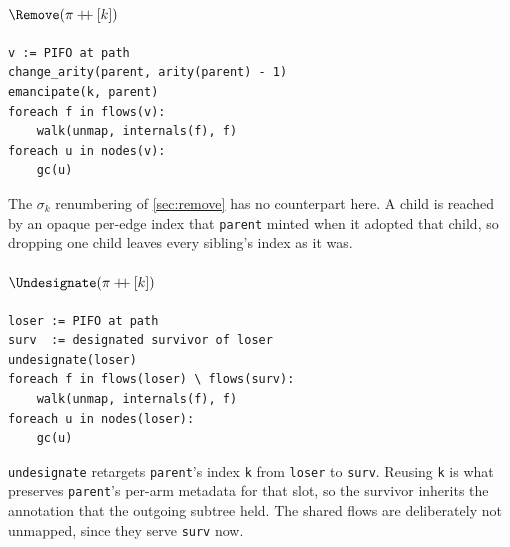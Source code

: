 \paragraph{\(\Remove(\pi \mathbin{+\!\!+} [k])\)}
\begin{Verbatim}
v := PIFO at path
change_arity(parent, arity(parent) - 1)
emancipate(k, parent)
foreach f in flows(v):
    walk(unmap, internals(f), f)
foreach u in nodes(v):
    gc(u)
\end{Verbatim}
The \(\sigma_k\) renumbering of \cref{sec:remove} has no counterpart here.
A child is reached by an opaque per-edge index that \texttt{parent} minted when it adopted that child, so dropping one child leaves every sibling's index as it was.

\paragraph{\(\Undesignate(\pi \mathbin{+\!\!+} [k])\)}
\begin{Verbatim}
loser := PIFO at path
surv  := designated survivor of loser
undesignate(loser)
foreach f in flows(loser) \ flows(surv):
    walk(unmap, internals(f), f)
foreach u in nodes(loser):
    gc(u)
\end{Verbatim}
\texttt{undesignate} retargets \texttt{parent}'s index \texttt{k} from \texttt{loser} to \texttt{surv}.
Reusing \texttt{k} is what preserves \texttt{parent}'s per-arm metadata for that slot, so the survivor inherits the annotation that the outgoing subtree held.
The shared flows are deliberately not unmapped, since they serve \texttt{surv} now.

